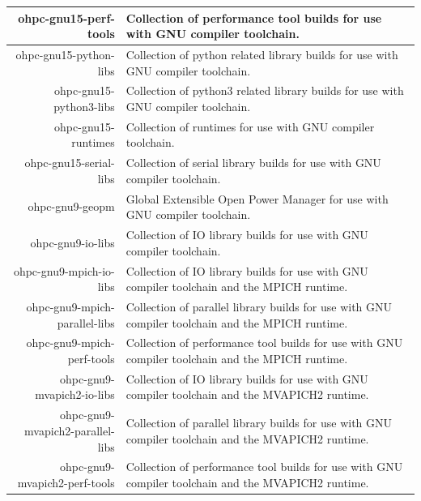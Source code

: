 \begin{tabularx}{\textwidth}{r|X}
\hline
ohpc-gnu15-perf-tools & Collection of performance tool builds for use with GNU compiler toolchain. \\ 
\hline
ohpc-gnu15-python-libs & Collection of python related library builds for use with GNU compiler toolchain. \\ 
\hline
ohpc-gnu15-python3-libs & Collection of python3 related library builds for use with GNU compiler toolchain. \\ 
\hline
ohpc-gnu15-runtimes & Collection of runtimes for use with GNU compiler toolchain. \\ 
\hline
ohpc-gnu15-serial-libs & Collection of serial library builds for use with GNU compiler toolchain. \\ 
\hline
ohpc-gnu9-geopm & Global Extensible Open Power Manager for use with GNU compiler toolchain. \\ 
\hline
ohpc-gnu9-io-libs & Collection of IO library builds for use with GNU compiler toolchain. \\ 
\hline
ohpc-gnu9-mpich-io-libs & Collection of IO library builds for use with GNU compiler toolchain and the MPICH runtime. \\ 
\hline
ohpc-gnu9-mpich-parallel-libs & Collection of parallel library builds for use with GNU compiler toolchain and the MPICH runtime. \\ 
\hline
ohpc-gnu9-mpich-perf-tools & Collection of performance tool builds for use with GNU compiler toolchain and the MPICH runtime. \\ 
\hline
ohpc-gnu9-mvapich2-io-libs & Collection of IO library builds for use with GNU compiler toolchain and the MVAPICH2 runtime. \\ 
\hline
ohpc-gnu9-mvapich2-parallel-libs & Collection of parallel library builds for use with GNU compiler toolchain and the MVAPICH2 runtime. \\ 
\hline
ohpc-gnu9-mvapich2-perf-tools & Collection of performance tool builds for use with GNU compiler toolchain and the MVAPICH2 runtime. \\ 
\hline
\bottomrule
\end{tabularx}
